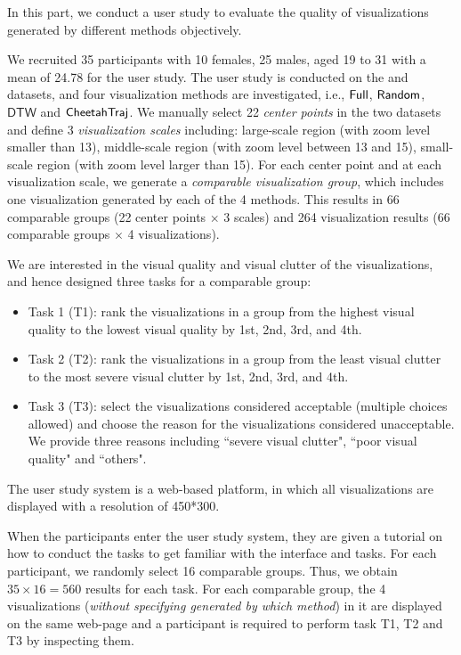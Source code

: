 In this part, we conduct a user study to evaluate the quality of visualizations generated by different methods objectively.

We recruited 35 participants with 10 females, 25 males, aged 19 to 31 with a mean of 24.78 for the user study. 
The user study is conducted on the \pt{} and \sz{} datasets, and four visualization methods are investigated, i.e., $\mathsf{Full}$, $\mathsf{Random}$, $\mathsf{DTW}$ and $\mathsf{CheetahTraj}$. We manually select 22 \textit{center points} in the two datasets and define 3 \textit{visualization scales} including:
large-scale region (with zoom level smaller than 13), middle-scale region (with zoom level between 13 and 15), small-scale region (with zoom level larger than 15). For each center point and at each visualization scale, we generate a \textit{comparable visualization group}, which includes one visualization generated by each of the 4 methods. This results in 66 comparable groups (22 center points $\times$ 3 scales) and 264 visualization results (66 comparable groups $\times$ 4 visualizations).

We are interested in the visual quality and visual clutter of the visualizations, and hence designed three tasks for a comparable group:
\begin{itemize}
	\item Task 1 (T1): rank the visualizations in a group from the highest visual quality to the lowest visual quality by 1st, 2nd, 3rd, and 4th.
	\item Task 2 (T2): rank the visualizations in a group from the least visual clutter to the most severe visual clutter by 1st, 2nd, 3rd, and 4th.
	\item Task 3 (T3): select the visualizations considered acceptable (multiple choices allowed) and choose the reason for the visualizations considered unacceptable. We provide three reasons including ``severe visual clutter", ``poor visual quality" and ``others".
\end{itemize}

The user study system is a web-based platform, in which all visualizations are displayed with a resolution of 450*300.


 When the participants enter the user study system, they are given a tutorial on how to conduct the tasks to get familiar with the interface and tasks.
For each participant, we randomly select 16 comparable groups.
Thus, we obtain $35 \times 16 = 560$ results for each task.
For each comparable group, the 4 visualizations (\textit{without specifying generated by which method}) in it are displayed on the same web-page and a participant is required to perform task T1, T2 and T3 by inspecting them.


